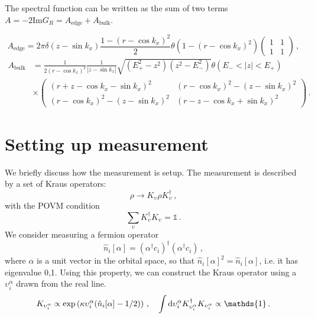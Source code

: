 \documentclass[aps,prx,preprint,amsmath,amssymb]{revtex4-2}
\newcommand{\rd}{{\rm d}}
\renewcommand{\Im}{\text{Im}}
\begin{document}
The spectral function can be written as the sum of two terms $A=-2\Im G_R=A_\text{edge}+A_\text{bulk}$.

\begin{equation}\label{}
  A_\text{edge}=2\pi \delta(z-\sin k_x) \frac{1-(r-\cos k_x)^2}{2}\theta(1-(r-\cos k_x)^2)\begin{pmatrix}
           1 & 1 \\
           1 & 1 
         \end{pmatrix}\,,
\end{equation}
\begin{equation}\label{}
\begin{split}
  A_\text{bulk}&=\frac{1}{2(r-\cos k_x)^2}\frac{1}{|z-\sin k_x|}\sqrt{(E_+^2-z^2)(z^2-E_-^2)}\theta(E_-<|z|<E_+) \\
  &\times \begin{pmatrix}
                                                                                (r+z-\cos k_x-\sin k_x)^2 & (r-\cos k_x)^2-(z-\sin k_x)^2 \\
                                                                                 (r-\cos k_x)^2-(z-\sin k_x)^2 & (r-z-\cos k_x+\sin k_x)^2 
                                                                              \end{pmatrix}\,.
\end{split}
\end{equation}

\section{Setting up measurement}

We briefly discuss how the measurement is setup. The measurement is described by a set of Kraus operators:
\begin{equation}\label{}
  \rho\to K_\upsilon \rho K^\dagger_\upsilon\,,
\end{equation} with the POVM condition 
\begin{equation}\label{}
  \sum_{\upsilon} K_\upsilon^\dagger K_\upsilon = \mathds{1}\,.
\end{equation} We consider measuring a fermion operator
\begin{equation}
\hat{n}_i[\alpha]=(\alpha^\dagger c_i)^\dagger (\alpha^\dagger c_i)\,,
\end{equation} where $\alpha$ is a unit vector in the orbital space, so that $\hat{n}_i[\alpha]^2=\hat{n}_i[\alpha]$, i.e. it has eigenvalue 0,1.  Using this property, we can construct the Kraus operator using a $\upsilon_i^\alpha$ drawn from the real line. 
\begin{equation}\label{}
  K_{\upsilon_i^\alpha} \propto \exp\left(\kappa \upsilon_i^\alpha (\hat{n}_i[\alpha]-1/2) \right)\,,\quad \int \rd \upsilon_i^\alpha K_{\upsilon_i^\alpha}^\dagger K_{\upsilon_i^\alpha} \propto \mathds{1}\,.
\end{equation}  
\end{document}
